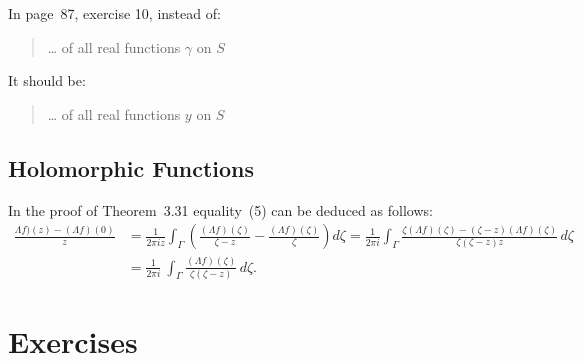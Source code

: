 In page~87, exercise 10, instead of:
\begin{quote}
\ldots\; of all real functions \(\gamma\) on $S$
\end{quote}
It should be:
\begin{quote}
\ldots\; of all real functions $y$ on $S$
\end{quote}

\subsection{Holomorphic Functions}

In the proof of Theorem~3.31 equality~(5) can be deduced as follows:
\begin{align*}
\frac{\Lambda f)(z) - (\Lambda f)(0)}{z}
&= \frac{1}{2\pi iz}\int_\Gamma 
   \left(\frac{(\Lambda f)(\zeta)}{\zeta - z} - \frac{(\Lambda f)(\zeta)}{\zeta}
   \right)d\zeta
 = \frac{1}{2\pi i}\int_\Gamma 
   \frac{\zeta(\Lambda f)(\zeta) - (\zeta - z)(\Lambda f)(\zeta)}{
         \zeta(\zeta - z)z} \,d\zeta \\
&= \frac{1}{2\pi i}\
   \int_\Gamma \frac{(\Lambda f)(\zeta)}{\zeta(\zeta - z)} \,d\zeta .
\end{align*}


\section{Exercises} %

